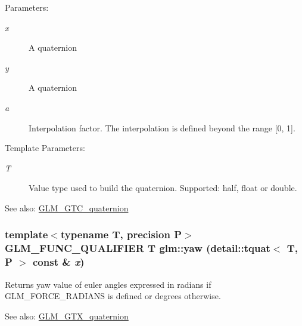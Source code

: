 \begin{Desc}
\item[Parameters:]
\begin{description}
\item[{\em x}]A quaternion \item[{\em y}]A quaternion \item[{\em a}]Interpolation factor. The interpolation is defined beyond the range \mbox{[}0, 1\mbox{]}. \end{description}
\end{Desc}
\begin{Desc}
\item[Template Parameters:]
\begin{description}
\item[{\em T}]Value type used to build the quaternion. Supported: half, float or double. \end{description}
\end{Desc}
\begin{Desc}
\item[See also:]\hyperlink{group__gtc__quaternion}{GLM\_\-GTC\_\-quaternion} \end{Desc}
\hypertarget{group__gtc__quaternion_g36e24dea9793778d8b1093daed17eba1}{
\subsubsection[yaw]{\setlength{\rightskip}{0pt plus 5cm}template$<$typename T, precision P$>$ GLM\_\-FUNC\_\-QUALIFIER T glm::yaw (detail::tquat$<$ T, P $>$ const \& {\em x})}}
\label{group__gtc__quaternion_g36e24dea9793778d8b1093daed17eba1}


Returns yaw value of euler angles expressed in radians if GLM\_\-FORCE\_\-RADIANS is defined or degrees otherwise.

\begin{Desc}
\item[See also:]\hyperlink{group__gtx__quaternion}{GLM\_\-GTX\_\-quaternion} \end{Desc}

